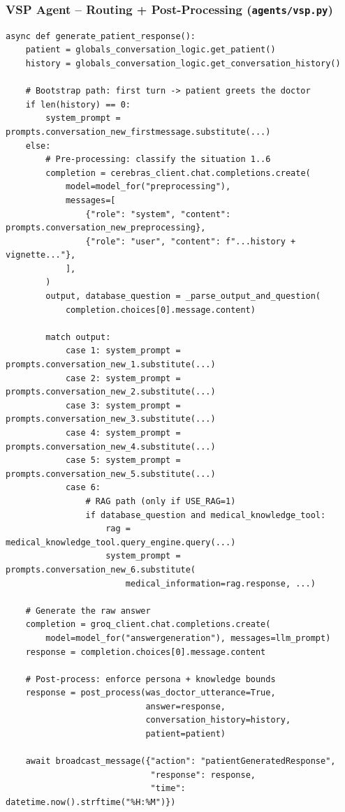 \documentclass{article}
\begin{document}
\subsubsection{VSP Agent -- Routing + Post-Processing (\texttt{agents/vsp.py})}

\begin{lstlisting}[style=codeblock]
async def generate_patient_response():
    patient = globals_conversation_logic.get_patient()
    history = globals_conversation_logic.get_conversation_history()

    # Bootstrap path: first turn -> patient greets the doctor
    if len(history) == 0:
        system_prompt = prompts.conversation_new_firstmessage.substitute(...)
    else:
        # Pre-processing: classify the situation 1..6
        completion = cerebras_client.chat.completions.create(
            model=model_for("preprocessing"),
            messages=[
                {"role": "system", "content": prompts.conversation_new_preprocessing},
                {"role": "user", "content": f"...history + vignette..."},
            ],
        )
        output, database_question = _parse_output_and_question(
            completion.choices[0].message.content)

        match output:
            case 1: system_prompt = prompts.conversation_new_1.substitute(...)
            case 2: system_prompt = prompts.conversation_new_2.substitute(...)
            case 3: system_prompt = prompts.conversation_new_3.substitute(...)
            case 4: system_prompt = prompts.conversation_new_4.substitute(...)
            case 5: system_prompt = prompts.conversation_new_5.substitute(...)
            case 6:
                # RAG path (only if USE_RAG=1)
                if database_question and medical_knowledge_tool:
                    rag = medical_knowledge_tool.query_engine.query(...)
                    system_prompt = prompts.conversation_new_6.substitute(
                        medical_information=rag.response, ...)

    # Generate the raw answer
    completion = groq_client.chat.completions.create(
        model=model_for("answergeneration"), messages=llm_prompt)
    response = completion.choices[0].message.content

    # Post-process: enforce persona + knowledge bounds
    response = post_process(was_doctor_utterance=True,
                            answer=response,
                            conversation_history=history,
                            patient=patient)

    await broadcast_message({"action": "patientGeneratedResponse",
                             "response": response,
                             "time": datetime.now().strftime("%H:%M")})
\end{lstlisting}
\end{document}
